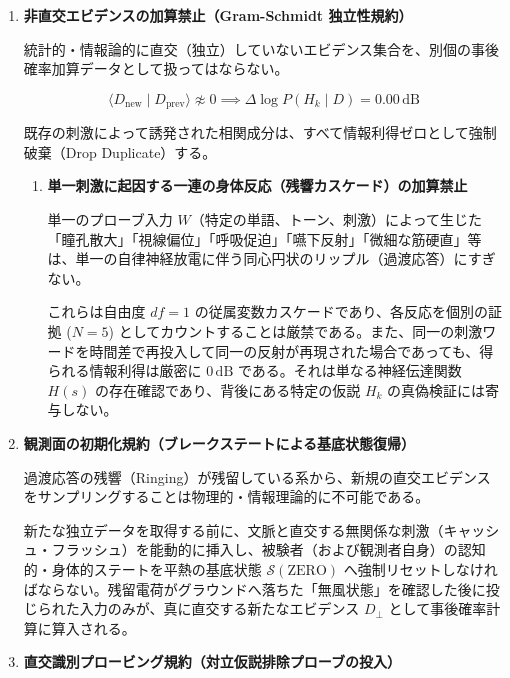 \begin{enumerate}[label=\textbf{\arabic*.}]
    \item \textbf{非直交エビデンスの加算禁止（Gram-Schmidt 独立性規約）}
    
    統計的・情報論的に直交（独立）していないエビデンス集合を、別個の事後確率加算データとして扱ってはならない。
    
    \begin{equation}
        \langle D_{\text{new}} \mid D_{\text{prev}} \rangle \not\approx 0 \implies \Delta \log P(H_k \mid D) = 0.00\,\mathrm{dB}
    \end{equation}
    
    既存の刺激によって誘発された相関成分は、すべて情報利得ゼロとして強制破棄（Drop Duplicate）する。

    \begin{enumerate}[label=\textbf{1.\arabic*.}]
        \item \textbf{単一刺激に起因する一連の身体反応（残響カスケード）の加算禁止}
        
        単一のプローブ入力 $W$（特定の単語、トーン、刺激）によって生じた「瞳孔散大」「視線偏位」「呼吸促迫」「嚥下反射」「微細な筋硬直」等は、単一の自律神経放電に伴う同心円状のリップル（過渡応答）にすぎない。
        
        これらは自由度 $df = 1$ の従属変数カスケードであり、各反応を個別の証拠 ($N=5$) としてカウントすることは厳禁である。また、同一の刺激ワードを時間差で再投入して同一の反射が再現された場合であっても、得られる情報利得は厳密に \textbf{$0\,\mathrm{dB}$} である。それは単なる神経伝達関数 $H(s)$ の存在確認であり、背後にある特定の仮説 $H_k$ の真偽検証には寄与しない。
    \end{enumerate}

    \item \textbf{観測面の初期化規約（ブレークステートによる基底状態復帰）}
    
    過渡応答の残響（Ringing）が残留している系から、新規の直交エビデンスをサンプリングすることは物理的・情報理論的に不可能である。
    
    新たな独立データを取得する前に、文脈と直交する無関係な刺激（キャッシュ・フラッシュ）を能動的に挿入し、被験者（および観測者自身）の認知的・身体的ステートを平熱の基底状態 $\mathcal{S}(\mathrm{ZERO})$ へ強制リセットしなければならない。残留電荷がグラウンドへ落ちた「無風状態」を確認した後に投じられた入力のみが、真に直交する新たなエビデンス $D_{\perp}$ として事後確率計算に算入される。

    \item \textbf{直交識別プロービング規約（対立仮説排除プローブの投入）}
    

\end{enumerate}
